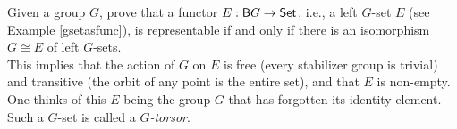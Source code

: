 \vspace{0.1in}

\begin{problem}\label{prob 4.5}
Given a group $G$, prove that a functor $E : \mathsf{B}G \to \mathsf{Set}$, i.e., a left $G$-set $E$ (see Example \ref{gsetasfunc}), is representable if and only if there is an isomorphism $G \cong E$ of left $G$-sets.\\[1em]This implies that the action of $G$ on $E$ is free (every stabilizer group is trivial) and transitive (the orbit of any point is the entire set), and that $E$ is non-empty. One thinks of this $E$ being the group $G$ that has forgotten its identity element. Such a $G$-set is called a \emph{$G$-torsor}.
\end{problem}